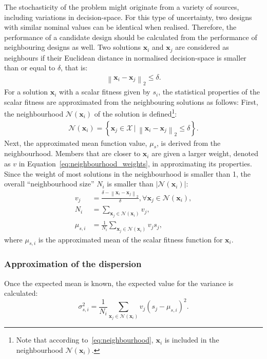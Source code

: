 \documentclass{llncs}
\newcommand{\brr}[1]{{\left({#1}\right)}} %
\newcommand{\brf}[1]{\left\lbrace{#1}\right\rbrace} %
\newcommand{\brabs}[1]{\left\vert{#1}\right\vert} %
\newcommand{\norm}[2]{\left\|{#1}\right\|_{#2}} %
\newcommand{\vx}{\mathbf{x}} %
\newcommand{\NSet}{\mathcal{N}} %
\newcommand{\XSet}{\mathcal{X}} %
\begin{document}
The stochasticity of the problem might originate from a variety of sources, including variations in decision-space. For this type of uncertainty, two designs with similar nominal values can be identical when realised. Therefore, the performance of a candidate design should be calculated from the performance of neighbouring designs as well. Two solutions $\vx_i$ and $\vx_j$ are considered as neighbours if their Euclidean distance in normalised decision-space is smaller than or equal to $\delta$, that is:
\begin{align}
\norm{\vx_i-\vx_j}{2}\leq\delta.
\end{align}
For a solution $\vx_i$ with a scalar fitness given by $s_i$, the statistical properties of the scalar fitness are approximated from the neighbouring solutions as follows:
First, the neighbourhood $\NSet(\vx_i)$ of the solution is defined\footnote{Note that according to~\eqref{eq:neighbourhood}, $\vx_i$ is included in the neighbourhood $\NSet(\vx_i)$.}:
\begin{align}
\NSet(\vx_i)=\brf{\vx_j\in \XSet \,\vert \,\norm{\vx_i-\vx_j}{2}\leq\delta}.
\label{eq:neighbourhood}
\end{align}
Next, the approximated mean function value, $\mu_s$, is derived from the neighbourhood.
Members that are closer to $\vx_i$ are given a larger weight, denoted as $v$ in Equation~\eqref{eq:neighbourhood_weights}, in approximating its properties.
Since the weight of most solutions in the neighbourhood is smaller than 1, the overall ``neighbourhood size'' $N_i$ is smaller than $\brabs{\NSet(\vx_i)}$:
\begin{align}
\label{eq:neighbourhood_weights}
v_j &= \frac{\delta-\norm{\vx_i-\vx_j}{2}}{\delta}, \forall \vx_j\in\NSet(\vx_i),\\
\label{eq:neighbourhood_size}
N_i &= \sum_{\vx_j\in\NSet(\vx_i)} v_j,\\
\label{eq:neighbourhood_mean}
\mu_{s,i} &= \frac{1}{N_i}  \sum_{\vx_j\in\NSet(\vx_i)} v_j s_j,
\end{align}
where $\mu_{s,i}$ is the approximated mean of the scalar fitness function for $\vx_i$.

\subsubsection{Approximation of the dispersion}

Once the expected mean is known, the expected value for the variance is calculated:
\begin{equation}
\sigma_{s,i}^2 = \frac{1}{N_i} \sum_{\vx_j\in\NSet(\vx_i)} v_j \brr{s_j - \mu_{s,i}}^2 .
\label{eq:neighbourhood_variance}
\end{equation}
\end{document}
